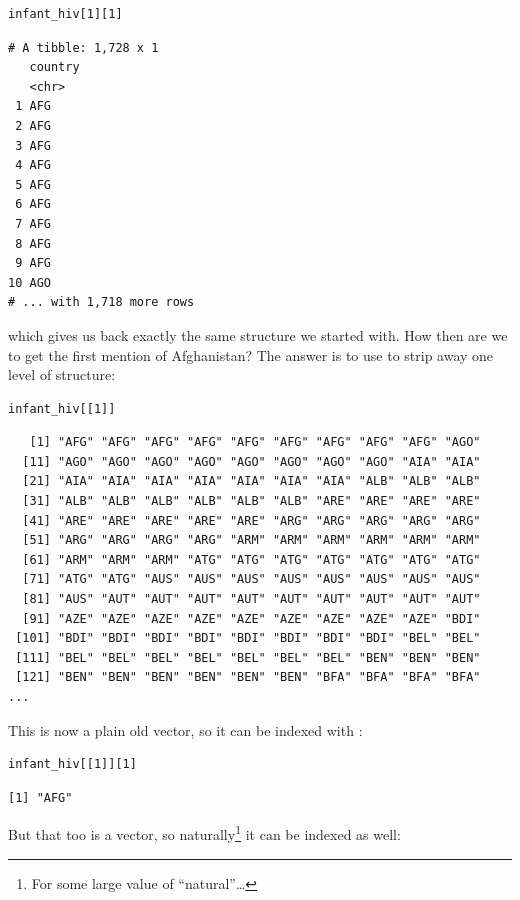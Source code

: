 \begin{lstlisting}
infant_hiv[1][1]
\end{lstlisting}

\begin{lstlisting}
# A tibble: 1,728 x 1
   country
   <chr>  
 1 AFG    
 2 AFG    
 3 AFG    
 4 AFG    
 5 AFG    
 6 AFG    
 7 AFG    
 8 AFG    
 9 AFG    
10 AGO    
# ... with 1,718 more rows
\end{lstlisting}

\noindent
which gives us back exactly the same structure we started with.
How then are we to get the first mention of Afghanistan?
The answer is to use 
to strip away one level of structure:

\begin{lstlisting}
infant_hiv[[1]]
\end{lstlisting}

\begin{lstlisting}
   [1] "AFG" "AFG" "AFG" "AFG" "AFG" "AFG" "AFG" "AFG" "AFG" "AGO"
  [11] "AGO" "AGO" "AGO" "AGO" "AGO" "AGO" "AGO" "AGO" "AIA" "AIA"
  [21] "AIA" "AIA" "AIA" "AIA" "AIA" "AIA" "AIA" "ALB" "ALB" "ALB"
  [31] "ALB" "ALB" "ALB" "ALB" "ALB" "ALB" "ARE" "ARE" "ARE" "ARE"
  [41] "ARE" "ARE" "ARE" "ARE" "ARE" "ARG" "ARG" "ARG" "ARG" "ARG"
  [51] "ARG" "ARG" "ARG" "ARG" "ARM" "ARM" "ARM" "ARM" "ARM" "ARM"
  [61] "ARM" "ARM" "ARM" "ATG" "ATG" "ATG" "ATG" "ATG" "ATG" "ATG"
  [71] "ATG" "ATG" "AUS" "AUS" "AUS" "AUS" "AUS" "AUS" "AUS" "AUS"
  [81] "AUS" "AUT" "AUT" "AUT" "AUT" "AUT" "AUT" "AUT" "AUT" "AUT"
  [91] "AZE" "AZE" "AZE" "AZE" "AZE" "AZE" "AZE" "AZE" "AZE" "BDI"
 [101] "BDI" "BDI" "BDI" "BDI" "BDI" "BDI" "BDI" "BDI" "BEL" "BEL"
 [111] "BEL" "BEL" "BEL" "BEL" "BEL" "BEL" "BEL" "BEN" "BEN" "BEN"
 [121] "BEN" "BEN" "BEN" "BEN" "BEN" "BEN" "BFA" "BFA" "BFA" "BFA"
...
\end{lstlisting}

This is now a plain old vector,
so it can be indexed with :

\begin{lstlisting}
infant_hiv[[1]][1]
\end{lstlisting}

\begin{lstlisting}
[1] "AFG"
\end{lstlisting}

But that too is a vector,
so naturally\footnote{For some large value of ``natural''{\ldots}}
it can be indexed as well:

